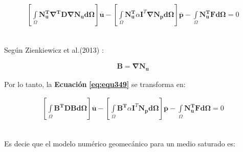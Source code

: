 \begin{ceqn} %
\begin{gather}\label{eq:equ349}
\left[\int\limits_\Omega \mathbf{N_{u}^T}\mathbf{\nabla^T}\mathbf{D}\mathbf{\nabla}\mathbf{N_u}\mathbf{d\Omega}\right]\mathbf{\overline{u}}  - \left[\int\limits_\Omega \mathbf{N_{u}^T}\alpha\mathbf{I}^T\mathbf{\nabla}\mathbf{N_p}\mathbf{d\Omega}\right]\mathbf{\overline{p}} - \int\limits_\Omega \mathbf{N_{u}^T}\mathbf{F}\mathbf{d\Omega} = 0
\end{gather}   
\end{ceqn}
\\
Según Zienkiewicz et al.(2013) \cite{Zienkiewicz2013TheFundamentals}:

\begin{ceqn} %
\begin{gather}\label{eq:equ350}
\mathbf{B} = \mathbf{\nabla N_u}
\end{gather}   
\end{ceqn}

Por lo tanto, la \textbf{Ecuación} \textbf{\ref{eq:equ349}} se transforma en:

\begin{ceqn} %
\begin{gather}\label{eq:equ351}
\left[\int\limits_\Omega \mathbf{B^T}\mathbf{D}\mathbf{B}\mathbf{d\Omega}\right]\mathbf{\overline{u}}  - \left[\int\limits_\Omega \mathbf{B^T}\alpha\mathbf{I}^T\mathbf{N_p}\mathbf{d\Omega}\right]\mathbf{\overline{p}} - \int\limits_\Omega \mathbf{N_{u}^T}\mathbf{F}\mathbf{d\Omega} = 0
\end{gather}   
\end{ceqn}
\\
Es decie que el modelo numérico geomecánico para un medio saturado es:

